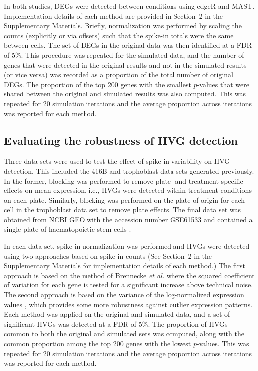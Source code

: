 \documentclass{article}
\newcommand{\suppsecsim}{2}
\begin{document}
In both studies, DEGs were detected between conditions using edgeR and MAST.
Implementation details of each method are provided in Section~\suppsecsim{} in the Supplementary Materials. 
Briefly, normalization was performed by scaling the counts (explicitly or via offsets) such that the spike-in totals were the same between cells.
The set of DEGs in the original data was then identified at a FDR of 5\%.
This procedure was repeated for the simulated data, and the number of genes that were detected in the original results and not in the simulated results (or vice versa) was recorded as a proportion of the total number of original DEGs.
The proportion of the top 200 genes with the smallest $p$-values that were shared between the original and simulated results was also computed.
This was repeated for 20 simulation iterations and the average proportion across iterations was reported for each method.

\subsection{Evaluating the robustness of HVG detection}
Three data sets were used to test the effect of spike-in variability on HVG detection.
This included the 416B and trophoblast data sets generated previously.
In the former, blocking was performed to remove plate- and treatment-specific effects on mean expression, i.e., HVGs were detected within treatment conditions on each plate.
Similarly, blocking was performed on the plate of origin for each cell in the trophoblast data set to remove plate effects.
The final data set was obtained from NCBI GEO with the accession number GSE61533 and contained a single plate of haematopoietic stem cells \cite{wilson2015combined}.

In each data set, spike-in normalization was performed and HVGs were detected using two approaches based on spike-in counts 
(See Section~\suppsecsim{} in the Supplementary Materials for implementation details of each method.)
The first approach is based on the method of Brennecke \textit{et al.} \cite{brennecke2013accounting} where the squared coefficient of variation for each gene is tested for a significant increase above technical noise.
The second approach is based on the variance of the log-normalized expression values \cite{lun2016stepbystep}, which provides some more robustness against outlier expression patterns.
Each method was applied on the original and simulated data, and a set of significant HVGs was detected at a FDR of 5\%.
The proportion of HVGs common to both the original and simulated sets was computed, along with the common proportion among the top 200 genes with the lowest $p$-values.
This was repeated for 20 simulation iterations and the average proportion across iterations was reported for each method.
\end{document}
